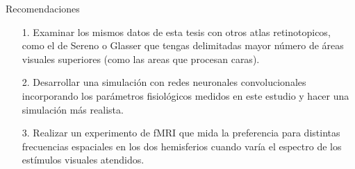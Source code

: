 \begin{recomendations}
    Recomendaciones
    
    \begin{itemize}
    	\item[1.] Examinar los mismos datos de esta tesis con otros atlas retinotopicos, como el de Sereno o Glasser que tengas delimitadas mayor número de áreas visuales superiores (como las areas que procesan caras). 
    	\item[2.] Desarrollar una simulación con redes neuronales convolucionales incorporando los parámetros fisiológicos medidos en este estudio y hacer una simulación más realista.
    	\item[3.] Realizar un experimento de fMRI que mida la preferencia para distintas frecuencias espaciales en los dos hemisferios cuando varía el espectro de los estímulos visuales atendidos.
    	
    \end{itemize}
    
   
\end{recomendations}
